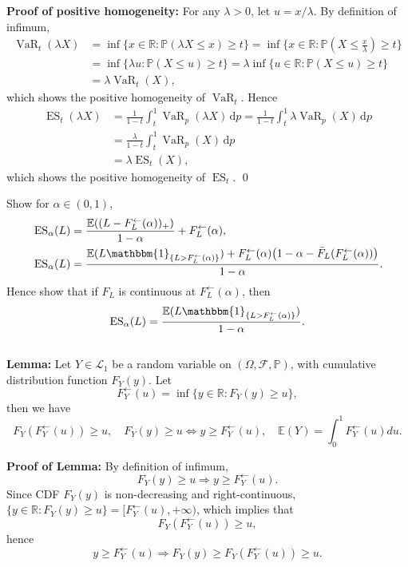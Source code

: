 \documentclass{MFM-hw} %
\newcommand{\VaR}{\operatorname{VaR}}
\newcommand{\ES}{\operatorname{ES}}
\newcommand{\real}{\mathbb{R}}
\newcommand{\dd}{\,\mathrm{d}}
\newcommand{\E}{\mathbb{E}}
\renewcommand{\P}{\mathbb{P}}
\begin{document}
\textbf{Proof of positive homogeneity: }For any $\lambda > 0$, let $u = x/\lambda$. By definition of infimum,
\begin{align*}
    \VaR_t(\lambda X) &= \inf \{ x \in \real : \P (\lambda X \leq x) \geq t\} = \inf \{ x \in \real : \P (X \leq \frac{x}{\lambda}) \geq t\}\\
    & = \inf \{ \lambda u : \P (X \leq u) \geq t\} = \lambda \inf \{ u \in \real : \P (X \leq u) \geq t\} \\
    & = \lambda \VaR_t(X),
\end{align*}
which shows the positive homogeneity of $\VaR_t$. Hence
\begin{align*}
    \ES_t(\lambda X) &= \frac{1}{1-t} \int_t^1 \VaR_p(\lambda X) \dd p = \frac{1}{1-t} \int_t^1 \lambda \VaR_p(X)  \dd p \\ 
    & = \frac{\lambda}{1-t}\int_t^1 \VaR_p(X) \dd p  \\
    & = \lambda \ES_t(X),
\end{align*}
which shows the positive homogeneity of $\ES_t$. \qed

\HWproblem
Show for $\alpha \in (0,1)$,
\begin{align*}
    &\ES_{\alpha}(L) = \frac{\E((L - F_L^{\leftarrow}(\alpha))_+)}{1-\alpha} +F_L^{\leftarrow}(\alpha),\\
    &\ES_{\alpha}(L) = \frac{\E(L\mathbbm{1}_{\{L>F_L^{\leftarrow}(\alpha)\}})+F_L^{\leftarrow}(\alpha)\bigl(1-\alpha-\bar{F}_L(F_L^{\leftarrow}(\alpha))\bigr)}{1-\alpha}.
\end{align*}
Hence show that if $F_L$ is continuous at $F_L^{\leftarrow}(\alpha)$, then
\[
    \ES_{\alpha}(L) = \frac{\E(L\mathbbm{1}_{\{L>F_L^{\leftarrow}(\alpha)\}})}{1-\alpha}.
\] \\

\textbf{Lemma: }Let $Y \in \mathcal{L}_1$ be a random variable on $(\Omega, \mathcal{F},\P)$, with cumulative distribution function $F_Y(y)$. Let 
\[
    F_Y^{\leftarrow}(u) = \inf \{y \in \real : F_Y(y) \ge u\},
\]
then we have
\[
    F_Y(F_Y^{\leftarrow}(u)) \ge u,\quad F_Y(y) \ge u \Leftrightarrow y \ge F_Y^{\leftarrow}(u), \quad \E(Y) = \int_0^1 F_Y^{\leftarrow}(u) du.
\]

\textbf{Proof of Lemma: }By definition of infimum,
\[
    F_Y(y) \ge u \Rightarrow y \ge F_Y^{\leftarrow}(u).
\]
Since CDF $F_Y(y)$ is non-decreasing and right-continuous, $\{y \in \real :F_Y(y) \ge u\} = [F_Y^{\leftarrow}(u), +\infty)$, which implies that
\[
    F_Y(F_Y^{\leftarrow}(u)) \ge u,
\]
hence
\[
    y \ge F_Y^{\leftarrow}(u) \Rightarrow F_Y(y) \ge F_Y(F_Y^{\leftarrow}(u)) \ge u. 
\]
\end{document}
